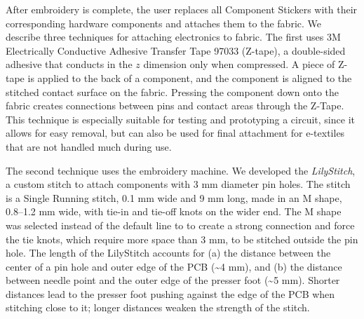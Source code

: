 \documentclass[header.tex]{subfiles}
\begin{document}


After embroidery is complete, the user replaces all Component Stickers with their corresponding hardware components and attaches them to the fabric.
We describe three techniques for attaching electronics to fabric. The first uses 3M Electrically Conductive Adhesive Transfer Tape 97033 (Z-tape), a double-sided adhesive that conducts in the $z$ dimension only when compressed. A piece of Z-tape is applied to the back of a component, and the component is aligned to the stitched contact surface on the fabric. Pressing the component down onto the fabric creates connections between pins and contact areas through the Z-Tape. This technique is especially suitable for testing and prototyping a circuit, since it allows for easy removal, but can also be used for final attachment for e-textiles that are not handled much during use.




The second technique uses the embroidery machine. We developed the \textit{LilyStitch}, a custom stitch to attach components with 3 mm diameter pin holes. The stitch is a Single Running stitch, 0.1 mm wide and 9 mm long, made in an M shape, 0.8--1.2 mm wide, with tie-in and tie-off knots on the wider end. The M shape was selected instead of the default line to to create a strong connection and force the tie knots, which require more space than 3 mm, to be stitched outside the pin hole.  
The length of the LilyStitch accounts for (a) the distance between the center of a pin hole and outer edge of the PCB (\textasciitilde 4 mm), and (b) the distance between needle point and the outer edge of the presser foot (\textasciitilde 5 mm). Shorter distances lead to the presser foot pushing against the edge of the PCB when stitching close to it; longer distances weaken the strength of the stitch.
\end{document}
